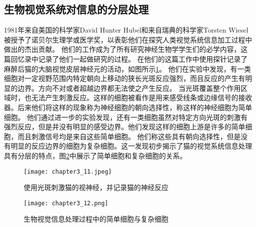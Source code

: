 \subsection{生物视觉系统对信息的分层处理}
1981年来自美国的科学家David Hunter Hubel和来自瑞典的科学家Torsten Wiesel被授予了诺贝尔生理学或医学奖，以表彰他们在探究人类视觉系统信息加工过程中做出的杰出贡献。
他们的工作成为了所有研究神经生物学学生们的必学内容，这篇回忆录\cite{Hubel1998EarlyEO}中记录了他们一起做研究的过程。
在他们的这篇工作\cite{https://doi.org/10.1113/jphysiol.1959.sp006308}中使用探针记录了麻醉后猫的大脑视觉皮层神经元的活动，如图所示\ref{fig:chapter3_11}。
他们在实验中发现，有一类细胞对一定视野范围内特定朝向上移动的狭长光斑反应强烈，而且反应的产生有明显的边界。方向不对或者超越边界都无法使之产生反应。
当光斑覆盖整个作用区域时，也无法产生刺激反应。这样的细胞被看作是用来感受线条或边缘信号的接收器。后来他们将这样的现象称为神经细胞的朝向选择性，称这样的神经细胞为简单细胞。
他们通过进一步的实验发现，还有一类细胞虽然对特定方向光斑的刺激有强烈反应，但是并没有明显的感受边界。他们发现这样的细胞上游是许多的简单细胞，而且刺激信号均是来自这些简单细胞。
他们称这些具有朝向选择性，但是没有明显的反应边界的细胞为复杂细胞。这一发现初步揭示了猫的视觉系统信息处理具有分层的特点，图\ref{fig:chapter3_12}中展示了简单细胞和复杂细胞的关系。
\begin{figure}
    \centering
    \texttt{[image: chapter3\_11.jpeg]}
    \caption{使用光斑刺激猫的视神经，并记录猫的神经反应\cite{yanjianweishi}}
    \label{fig:chapter3_11}
\end{figure}

\begin{figure}
    \centering
    \texttt{[image: chapter3\_12.png]}
    \caption{生物视觉信息处理过程中的简单细胞与复杂细胞\cite{hubel1962}}
    \label{fig:chapter3_12}
\end{figure}

